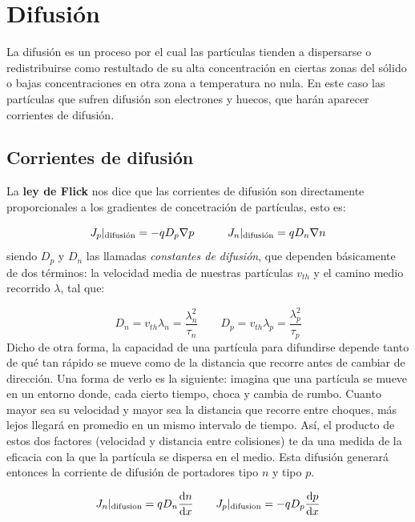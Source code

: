 \section{Difusión}

La difusión es un proceso por el cual las partículas tienden a dispersarse o redistribuirse como restultado de su alta concentración en ciertas zonas del sólido o bajas concentraciones en otra zona a temperatura no nula. En este caso las partículas que sufren difusión son electrones y huecos, que harán aparecer corrientes de difusión.

\subsection{Corrientes de difusión}

La \textbf{ley de Flick} nos dice que las corrientes de difusión son directamente proporcionales a los gradientes de concetración de partículas, esto es:

\begin{equation}
	J_p|_{\text{difusión}} = -qD_p\nabla p \quad \quad \quad
	J_n|_{\text{difusión}} =  qD_n\nabla n
\end{equation}
siendo $D_p$ y $D_n$ las llamadas \textit{constantes de difusión}, que dependen básicamente de dos términos: la velocidad media de nuestras partículas $v_{th}$ y el camino medio recorrido $\lambda$, tal que:

\begin{equation}
	D_n = v_{th} \lambda_{n} = \frac{\lambda_n^2}{\tau_n} \qquad D_p = v_{th} \lambda_{p}= \frac{\lambda_p^2}{\tau_p} 
\end{equation}
Dicho de otra forma, la capacidad de una partícula para difundirse depende tanto de qué tan rápido se mueve como de la distancia que recorre antes de cambiar de dirección. Una forma de verlo es la siguiente: imagina que una partícula se mueve en un entorno donde, cada cierto tiempo, choca y cambia de rumbo. Cuanto mayor sea su velocidad y mayor sea la distancia que recorre entre choques, más lejos llegará en promedio en un mismo intervalo de tiempo. Así, el producto de estos dos factores (velocidad y distancia entre colisiones) te da una medida de la eficacia con la que la partícula se dispersa en el medio. Esta difusión generará entonces la corriente de difusión de portadores tipo $n$ y tipo $p$.

\begin{equation}
	J_n |_{\text{difusion}} = qD_n \frac{\mathrm{d} n}{\mathrm{d} x} \qquad
	J_p |_{\text{difusion}} = -qD_p \frac{\mathrm{d} p}{\mathrm{d} x}
\end{equation}

